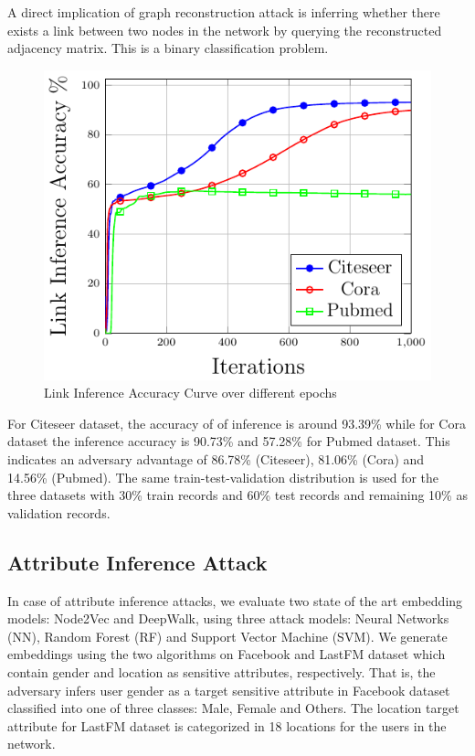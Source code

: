 A direct implication of graph reconstruction attack is inferring whether there exists a link between two nodes in the network by querying the reconstructed adjacency matrix.
This is a binary classification problem.

\begin{figure}
  \begin{center}
    \includegraphics[width=\linewidth]{figures/LinkInfer/LinkInfer.pdf}
  \end{center}
  \caption{Link Inference Accuracy Curve over different epochs}
\end{figure}

\noindent For Citeseer dataset, the accuracy of of inference is around 93.39\% while for Cora dataset the inference accuracy is 90.73\% and 57.28\% for Pubmed dataset.
This indicates an adversary advantage of 86.78\% (Citeseer), 81.06\% (Cora) and 14.56\% (Pubmed).
The same train-test-validation distribution is used for the three datasets with 30\% train records and 60\% test records and remaining 10\% as validation records.



\subsection{Attribute Inference Attack}

In case of attribute inference attacks, we evaluate two state of the art embedding models: Node2Vec and DeepWalk, using three attack models: Neural Networks (NN), Random Forest (RF) and Support Vector Machine (SVM).
We generate embeddings using the two algorithms on Facebook and LastFM dataset which contain gender and location as sensitive attributes, respectively.
That is, the adversary infers user gender as a target sensitive attribute in Facebook dataset classified into one of three classes: Male, Female and Others.
The location target attribute for LastFM dataset is categorized in 18 locations for the users in the network.

